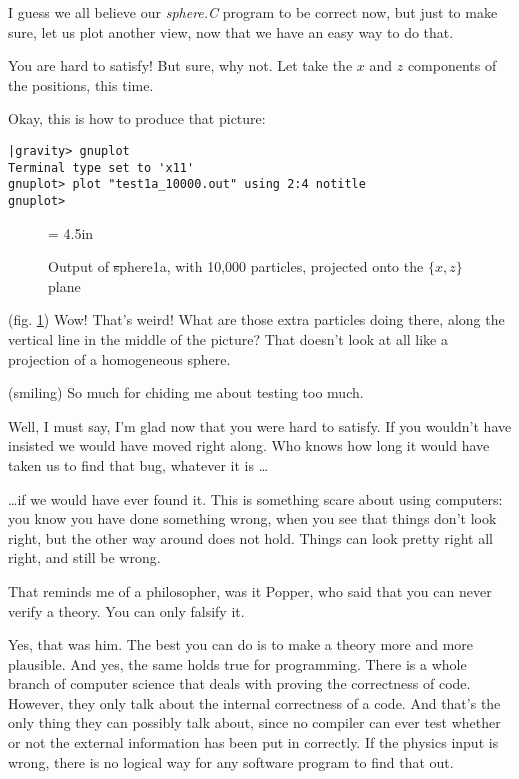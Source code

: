 \bob
I guess we all believe our {\sl sphere.C} program to be correct now,
but just to make sure, let us plot another view, now that we have an
easy way to do that.

\carol
You are hard to satisfy!  But sure, why not.  Let take the $x$ and $z$
components of the positions, this time.

\alice
Okay, this is how to produce that picture:

\cba

\begin{small}
\begin{verbatim}
|gravity> gnuplot
Terminal type set to 'x11'
gnuplot> plot "test1a_10000.out" using 2:4 notitle
gnuplot>
\end{verbatim}
\end{small}

\begin{figure}[htb]
\begin{center}
\epsfxsize = 4.5in
\caption[xz plot of {\st sphere1a} output]
{Output of {\st sphere1a}, with 10,000 particles, projected onto the
$\{x,z\}$ plane}
\label{fig:sphere1axz10000}
\end{center}
\end{figure}

\abc

\carol
(fig. \ref{fig:sphere1axz10000}) 
Wow!  That's weird!  What are those extra particles doing there, along
the vertical line in the middle of the picture?  That doesn't look at
all like a projection of a homogeneous sphere.

\bob
(smiling) So much for chiding me about testing too much.

\carol
Well, I must say, I'm glad now that you were hard to satisfy.  If you
wouldn't have insisted we would have moved right along.  Who knows how
long it would have taken us to find that bug, whatever it is \dots

\alice
\dots if we would have ever found it.  This is something scare about
using computers: you know you have done something wrong, when you see
that things don't look right, but the other way around does not hold.
Things can look pretty right all right, and still be wrong.

\bob
That reminds me of a philosopher, was it Popper, who said that you can
never verify a theory.  You can only falsify it.

\carol
Yes, that was him.  The best you can do is to make a theory more and
more plausible.  And yes, the same holds true for programming.  There
is a whole branch of computer science that deals with proving the
correctness of code.  However, they only talk about the internal
correctness of a code.  And that's the only thing they can possibly
talk about, since no compiler can ever test whether or not the
external information has been put in correctly.  If the physics input
is wrong, there is no logical way for any software program to find
that out.

